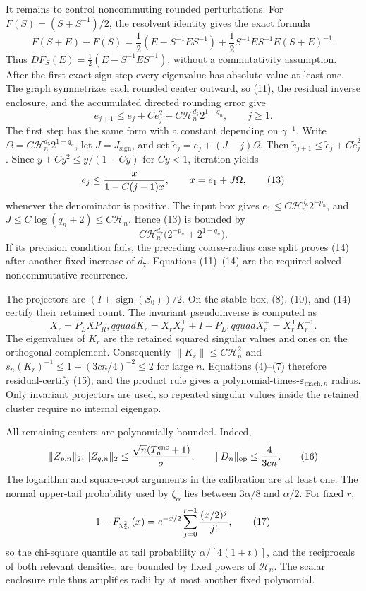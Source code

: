 It remains to control noncommuting rounded perturbations.  For
\(F(S)=(S+S^{-1})/2\), the resolvent identity gives the exact formula
\[
F(S+E)-F(S)
=\frac12(E-S^{-1}ES^{-1})
+\frac12S^{-1}ES^{-1}E(S+E)^{-1}.                                    \tag{11}
\]
Thus \(DF_S(E)=\frac12(E-S^{-1}ES^{-1})\), without a commutativity
assumption.  After the first exact sign step every eigenvalue has absolute value
at least one.  The graph symmetrizes each rounded center outward, so (11), the
residual inverse enclosure, and the accumulated directed rounding error give
\[
e_{j+1}\le e_j+C e_j^2+C\mathcal H_n^{d_5}2^{1-q_n},\qquad j\ge1.    \tag{12}
\]
The first step has the same form with a constant depending on \(\gamma^{-1}\).
Write \(\Omega=C\mathcal H_n^{d_5}2^{1-q_n}\), let
\(J=J_{
\mathrm{sign}}\), and set
\(\widetilde e_j=e_j+(J-j)\Omega\).  Then
\(\widetilde e_{j+1}\le\widetilde e_j+C\widetilde e_j^2\).  Since
\(y+Cy^2\le y/(1-Cy)\) for \(Cy<1\), iteration yields
\[
e_j\le {x\over1-C(j-1)x},
\qquad x=e_1+J\Omega,                                                  \tag{13}
\]
whenever the denominator is positive.  The input box gives
\(e_1\le C\mathcal H_n^{d_6}2^{-p_n}\), and
\(J\le C\log(q_n+2)\le C\mathcal H_n\).  Hence (13) is bounded by
\[
C\mathcal H_n^{d_7}
\bigl(2^{-p_n}+2^{1-q_n}\bigr).                                      \tag{14}
\]
If its precision condition fails, the preceding coarse-radius case split proves
(14) after another fixed increase of \(d_7\).  Equations (11)--(14) are the
required solved noncommutative recurrence.

The projectors are \((I\pm\operatorname{sign}(S_0))/2\).  On the stable box,
(8), (10), and (14) certify their retained count.  The invariant pseudoinverse
is computed as
\[
X_r=P_LXP_R,qquad K_r=X_rX_r^{\mathsf T}+I-P_L,qquad
X_r^+=X_r^{\mathsf T}K_r^{-1}.                                       \tag{15}
\]
The eigenvalues of \(K_r\) are the retained squared singular values and ones on
the orthogonal complement.  Consequently
\(\|K_r\|\le C\mathcal H_n^2\) and
\(s_n(K_r)^{-1}\le1+(3cn/4)^{-2}\le2\) for large \(n\).  Equations
(4)--(7) therefore residual-certify (15), and the product rule gives a
polynomial-times-\(\varepsilon_{
\mathrm{mach},n}\) radius.  Only invariant projectors are used, so repeated
singular values inside the retained cluster require no internal eigengap.

All remaining centers are polynomially bounded.  Indeed,
\[
\|Z_{p,n}\|_2,\|Z_{q,n}\|_2
\le {\sqrt n(T_n^{\mathrm{enc}}+1)\over\sigma},
\qquad \|D_n\|_{
\mathrm{op}}\le {4\over3cn}.                                        \tag{16}
\]
The logarithm and square-root arguments in the calibration are at least one.
The normal upper-tail probability used by \(\zeta_\alpha\) lies between
\(3\alpha/8\) and \(\alpha/2\).  For fixed \(r\),
\[
1-F_{\chi^2_{2r}}(x)
=e^{-x/2}\sum_{j=0}^{r-1}{(x/2)^j\over j!},                           \tag{17}
\]
so the chi-square quantile at tail probability
\(\alpha/[4(1+t)]\), and the reciprocals of both relevant densities, are
bounded by fixed powers of \(\mathcal H_n\).  The scalar enclosure rule thus
amplifies radii by at most another fixed polynomial.

